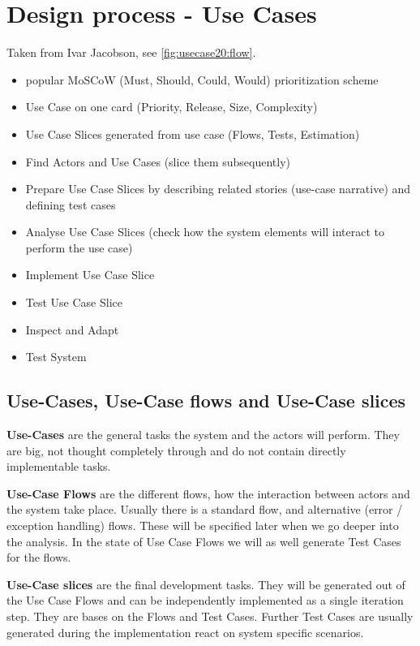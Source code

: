 {\color{gray}
\section{Design process - Use Cases}
Taken from Ivar Jacobson, see \autoref{fig:usecase20:flow}.
\begin{itemize}
	\item popular MoSCoW (Must, Should, Could, Would) prioritization scheme
	\item Use Case on one card (Priority, Release, Size, Complexity)
	\item Use Case Slices generated from use case (Flows, Tests, Estimation)
	\item Find Actors and Use Cases (slice them subsequently)
	\item Prepare Use Case Slices by describing related stories (use-case narrative) and defining test cases
	\item Analyse Use Case Slices (check how the system elements will interact to perform the use case)
	\item Implement Use Case Slice
	\item Test Use Case Slice
	\item Inspect and Adapt
	\item Test System
\end{itemize}

\subsection{Use-Cases, Use-Case flows and Use-Case slices}

\textbf{Use-Cases} are the general tasks the system and the actors will perform. They are big, not thought completely through and do not contain directly implementable tasks.

\textbf{Use-Case Flows} are the different flows, how the interaction between actors and the system take place. Usually there is a standard flow, and alternative (error / exception handling) flows. These will be specified later when we go deeper into the analysis. In the state of Use Case Flows we will as well generate Test Cases for the flows. 

\textbf{Use-Case slices} are the final development tasks. They will be generated out of the Use Case Flows and can be independently implemented as a single iteration step. They are bases on the Flows and Test Cases. Further Test Cases are usually generated during the implementation react on system specific scenarios.


}
